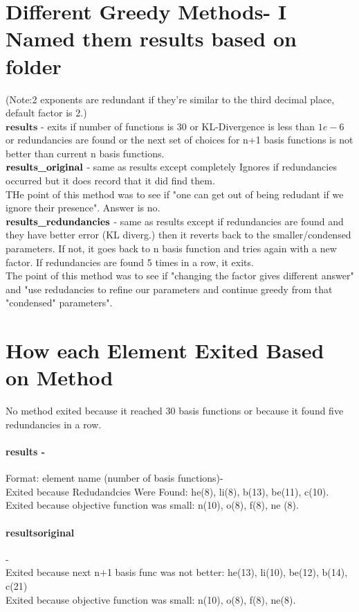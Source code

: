 \documentclass[]{article}
\begin{document}
\section{Different Greedy Methods- I Named them results based on folder}
(Note:2 exponents are redundant if they're similar to the third decimal place, default factor is 2.)\\
$\textbf{results}$ - exits if number of functions is $30$ or KL-Divergence is less than $1e-6$ or redundancies are found or the next set of choices for n+1 basis functions is not better than current n basis functions. \\
$\textbf{results\textunderscore original}$ - same as results except completely Ignores if redundancies occurred but it does record that it did find them.\\ THe point of this method was to see if "one can get out of being redudant if we ignore their presence". Answer is no.\\
$\textbf{results\textunderscore redundancies}$ - same as results except if redundancies are found and they have better error (KL diverg.) then it reverts back to the smaller/condensed parameters. If not, it goes back to n basis function and tries again with a new factor. If redundancies are found 5 times in a row, it exits.\\ The point of this method was to see if "changing the factor gives different answer" and "use redudancies to refine our parameters and continue greedy from that "condensed" parameters".

\section{How each Element Exited Based on Method} 
No method exited because it reached 30 basis functions or because it found five redundancies in a row. 
\paragraph{results - }Format: element name (number of basis functions)-\\ Exited because Redudandcies Were Found: he(8), li(8), b(13), be(11), c(10). \\
Exited because objective function was small: n(10), o(8), f(8), ne (8). 

\paragraph{results\textunderscore original} -\\
Exited because next n+1 basis func was not better: he(13), li(10), be(12), b(14), c(21) \\
Exited because objective function was small: n(10), o(8), f(8), ne(8).
\end{document}
